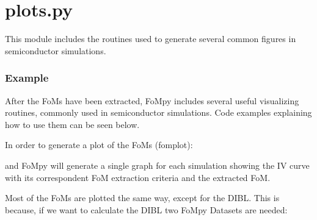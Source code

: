 \documentclass[letterpaper,10pt,english,openany, oneside]{sphinxmanual}
\begin{document}
\label{\detokenize{index:module-fompy.plots}}

\section{plots.py}
\label{\detokenize{index:plots-py}}
This module includes the routines used to generate several common figures
in semiconductor simulations.
\subsubsection*{Example}

After the FoMs have been extracted, FoMpy includes several useful visualizing routines,
commonly used in semiconductor simulations. Code examples explaining how to use them can be seen below.

In order to generate a plot of the FoMs (fomplot):

%
\begin{sphinxVerbatim}[commandchars=\\\{\}]
 
  
   
     
   
\end{sphinxVerbatim}

and FoMpy will generate a single graph for each simulation showing the IV curve with its correspondent FoM extraction criteria and the extracted FoM.

Most of the FoMs are plotted the same way, except for the DIBL. This is because, if we want to calculate the DIBL
two FoMpy Datasets are needed:
\end{document}
